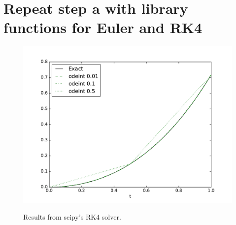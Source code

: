 \documentclass[onecolumn,10pt]{jhwhw}
\begin{document}
\part{Repeat step a with library functions for Euler and RK4}
\begin{figure}[h!]
\begin{center}
\includegraphics[width=.5\textwidth]{odeint.pdf}
\label{fig:on}
\end{center}
\caption{Results from scipy's RK4 solver.}
\end{figure}
\end{document}
